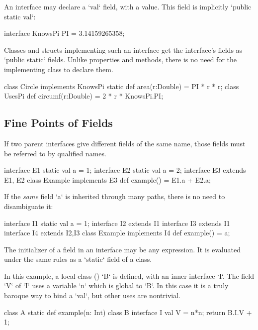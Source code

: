 An interface may declare a \xcd`val` field, with a value.  This field is implicitly
\xcd`public static val`: 
\begin{xten}
interface KnowsPi {
  PI = 3.14159265358;
}
\end{xten}
%

Classes and structs implementing such an interface get the interface's fields as
\xcd`public static` fields.  Unlike properties and methods, there is no need
for the implementing class to declare them. 
\begin{xten}
class Circle implements KnowsPi {
  static def area(r:Double) = PI * r * r;
}
class UsesPi {
  def circumf(r:Double) = 2 * r * KnowsPi.PI;
}
\end{xten}
%

\subsection{Fine Points of Fields}

If two parent interfaces give different fields of the same name, 
those fields must be referred to by qualified names.
% 
\begin{xten}
interface E1 {static val a = 1;}
interface E2 {static val a = 2;}
interface E3 extends E1, E2{}
class Example implements E3 {
  def example() = E1.a + E2.a;
}
\end{xten}
%

If the {\em same} field \xcd`a` is inherited through many paths, there is no need to
disambiguate it:
\begin{xten}
interface I1 { static val a = 1;} 
interface I2 extends I1 {}
interface I3 extends I1 {}
interface I4 extends I2,I3 {}
class Example implements I4 {
  def example() = a;
}
\end{xten}
%

The initializer of a field in an interface may be any expression.  It is
evaluated under the same rules as a \xcd`static` field of a class. 

\begin{ex}
In this example, a local class () \xcd`B` is defined,
with an inner interface \xcd`I`.  The field \xcd`V` of \xcd`I` uses a variable
\xcd`n` which is global to \xcd`B`.   In this case it is a truly baroque way
to bind a \xcd`val`, but other uses are nontrivial.

\begin{xten}
class A {
  static def example(n: Int) {
    class B {
      interface I { val V = n*n; }
    }
   return B.I.V + 1;
  }
}
\end{xten}
\end{ex}

